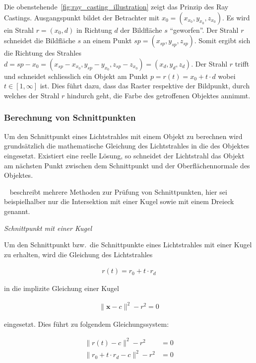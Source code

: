 Die obenstehende~\autoref{fig:ray_casting_illustration} zeigt das
Prinzip des Ray Castings. Ausgangspunkt bildet der Betrachter mit $x_{0}
= (x_{x_{0}}, y_{x_{0}}, z_{x_{0}})$. Es wird ein Strahl $r = (x_{0},
d)$ in Richtung $d$ der Bildfläche $s$ ``geworfen''. Der Strahl $r$
schneidet die Bildfläche $s$ an einem Punkt $sp = (x_{sp}, y_{sp},
z_{sp})$.  Somit ergibt sich die Richtung des Strahles $d = sp - x_{0} =
(x_{sp} - x_{x_{0}}, y_{sp} - y_{x_{0}}, z_{sp} - z_{x_{0}}) = (x_{d},
y_{d}, z_{d})$. Der Strahl $r$ trifft und schneidet schliesslich ein
Objekt am Punkt $p = r(t) = x_{0} + t \cdot d$ wobei $t \in [1, \infty]$
ist. Dies führt dazu, dass das Raster respektive der Bildpunkt, durch
welches der Strahl $r$ hindurch geht, die Farbe des getroffenen Objektes
annimmt.

\subsubsection{Berechnung von Schnittpunkten}
\label{ssubsec:ray_casting_intersections}

Um den Schnittpunkt eines Lichtstrahles mit einem Objekt zu berechnen
wird grundsätzlich die mathematische Gleichung des Lichtstrahles in die
des Objektes eingesetzt. Existiert eine reelle Lösung, so schneidet der
Lichtstrahl das Objekt am nächsten Punkt zwischen dem Schnittpunkt und
der Oberflächennormale des Objektes.

~\citeauthor{glassner_introduction_1989} beschreibt mehrere Methoden zur
Prüfung von Schnittpunkten, hier sei beispielhalber nur die Intersektion
mit einer Kugel sowie mit einem Dreieck genannt.

\textit{Schnittpunkt mit einer Kugel}

Um den Schnittpunkt bzw.\ die Schnittpunkte eines Lichtstrahles mit
einer Kugel zu erhalten, wird die Gleichung des Lichtstrahles

\begin{gather}\label{eq:ray_equation}
    r(t) = r_{0} + t \cdot r_{d}
\end{gather}

in die implizite Gleichung einer Kugel

\begin{gather}
    \|\bm{x} - c\|^{2} - r^{2} = 0
\end{gather}

eingesetzt. Dies führt zu folgendem Gleichungssystem:

\begin{align}
    \|r(t) - c\|^{2} - r^{2} &= 0 \\
    \|r_{0} + t \cdot r_{d} - c\|^{2} - r^{2} &= 0
\end{align}

